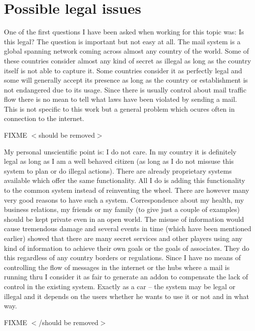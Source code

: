 \section{Possible legal issues}
One of the first questions I have been asked when working for this topic was: Is this legal? The question is important but not easy at all. The mail system is a global spanning network coming across almost any country of the world. Some of these countries consider almost any kind of secret as illegal as long as the country itself is not able to capture it. Some countries consider it as perfectly legal and some will generally accept its presence as long as the country or establishment is not endangered due to its usage. Since there is usually control about mail traffic flow there is no mean to tell what laws have been violated by sending a mail. This is not specific to this work but a general problem which ocures often in connection to the internet.\par

FIXME $<$should be removed$>$\par
My personal unscientific point is: I do not care. In my country it is definitely legal as long as I am a well behaved citizen (as long as I do not missuse this system to plan or do illegal actions). There are already proprietary systems available which offer the same functionality. All I do is adding this functionality to the common system instead of reinventing the wheel. There are however many very good reasons to have such a system. Correspondence about my health, my business relations, my friends or my family (to give just a couple of examples) should be kept private even in an open world. The misuse of information would cause tremendous damage and several events in time (which have been mentioned earlier) showed that there are many secret services and other players using any kind of information to achieve their own goals or the goals of associates. They do this regardless of any country borders or regulations. Since I have no means of controlling the flow of messages in the internet or the hubs where a mail is running thru I consider it as fair to generate an addon to compensate the lack of control in the existing system. Exactly as a car -- the system may be legal or illegal and it depends on the users whether he wants to use it or not and in what way.\par
FIXME $<$/should be removed$>$